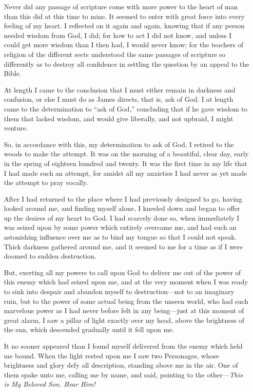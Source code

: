Never did any passage of scripture come with more power to the heart of man than this did at
this time to mine. It seemed to enter with great force into every feeling of my heart. I
reflected on it again and again, knowing that if any person needed wisdom from God, I did;
for how to act I did not know, and unless I could get more wisdom than I then had, I would
never know; for the teachers of religion of the different sects understood the same passages
of scripture so differently as to destroy all confidence in settling the question by an appeal to
the Bible.

At length I came to the conclusion that I must either remain in darkness and confusion, or
else I must do as James directs, that is, ask of God. I at length came to the determination to
``ask of God,'' concluding that if he gave wisdom to them that lacked wisdom, and would give
liberally, and not upbraid, I might venture.

So, in accordance with this, my determination to ask of God, I retired to the woods to make
the attempt. It was on the morning of a beautiful, clear day, early in the spring of eighteen
hundred and twenty. It was the first time in my life that I had made such an attempt, for
amidst all my anxieties I had never as yet made the attempt to pray vocally.

After I had returned to the place where I had previously designed to go, having looked
around me, and finding myself alone, I kneeled down and began to offer up the desires of my
heart to God. I had scarcely done so, when immediately I was seized upon by some power
which entirely overcame me, and had such an astonishing influence over me as to bind my
tongue so that I could not speak. Thick darkness gathered around me, and it seemed to me for
a time as if I were doomed to sudden destruction.

But, exerting all my powers to call upon God to deliver me out of the power of this enemy
which had seized upon me, and at the very moment when I was ready to sink into despair and
abandon myself to destruction—not to an imaginary ruin, but to the power of some actual
being from the unseen world, who had such marvelous power as I had never before felt in
any being—just at this moment of great alarm, I saw a pillar of light exactly over my head,
above the brightness of the sun, which descended gradually until it fell upon me.

It no sooner appeared than I found myself delivered from the enemy which held me bound.
When the light rested upon me I saw two Personages, whose brightness and glory defy all
description, standing above me in the air. One of them spake unto me, calling me by name,
and said, pointing to the other—\textit{This is My Beloved Son. Hear Him!}

